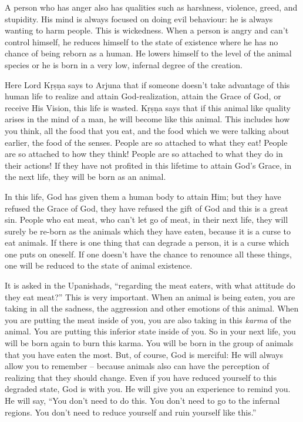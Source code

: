 A person who has anger also has qualities such as harshness, violence, greed, and stupidity. His mind is always focused on doing evil behaviour: he is always wanting to harm people. This is wickedness. When a person is angry and can’t control himself, he reduces himself to the state of existence where he has no chance of being reborn as a human. He lowers himself to the level of the animal species or he is born in a very low, infernal degree of the creation.

Here Lord Kṛṣṇa says to Arjuna that if someone doesn’t take advantage of this human life to realize and attain God-realization, attain the Grace of God, or receive His Vision, this life is wasted. Kṛṣṇa says that if this animallike quality arises in the mind of a man, he will become like this animal. This includes how you think, all the food that you eat, and the food which we were talking about earlier, the food of the senses. People are so attached to what they eat! People are so attached to how they think! People are so attached to what they do in their actions! If they have not profited in this lifetime to attain God’s Grace, in the next life, they will be born as an animal.

In this life, God has given them a human body to attain Him; but they have refused the Grace of God, they have refused the gift of God and this is a great sin. People who eat meat, who can’t let go of meat, in their next life, they will surely be re-born as the animals which they have eaten, because it is a curse to eat animals. If there is one thing that can degrade a person, it is a curse which one puts on oneself. If one doesn’t have the chance to renounce all these things, one will be reduced to the state of animal existence.

It is asked in the Upanishads, “regarding the meat eaters, with what attitude do they eat meat?” This is very important. When an animal is being eaten, you are taking in all the sadness, the aggression and other emotions of this animal. When you are putting the meat inside of you, you are also taking in this \textit{karma} of the animal. You are putting this inferior state inside of you. So in your next life, you will be born again to burn this karma. You will be born in the group of animals that you have eaten the most. But, of course, God is merciful: He will always allow you to remember – because animals also can have the perception of realizing that they should change. Even if you have reduced yourself to this degraded state, God is with you. He will give you an experience to remind you. He will say, “You don’t need to do this. You don’t need to go to the infernal regions. You don’t need to reduce yourself and ruin yourself like this.”

